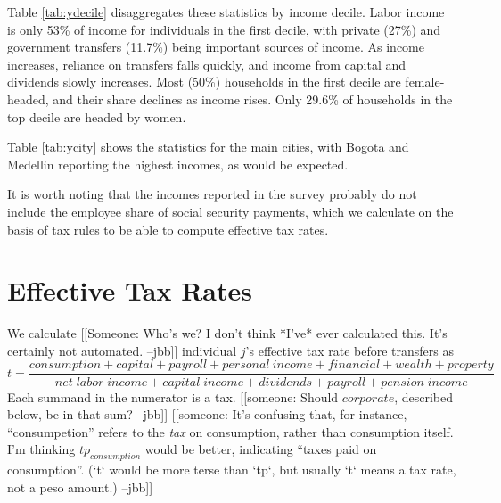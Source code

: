 \documentclass[12pt]{article}
\begin{document}
Table \ref{tab:ydecile} disaggregates these statistics by income decile.
Labor income is only 53\% of income for individuals in the first decile,
with private (27\%) and government transfers (11.7\%)
being important sources of income.
As income increases, reliance on transfers falls quickly,
and income from capital and dividends slowly increases.
Most (50\%) households in the first decile are female-headed,
and their share declines as income rises.
Only 29.6\% of households in the top decile are headed by women.

Table \ref{tab:ycity} shows the statistics for the main cities,
with Bogota and Medellin reporting the highest incomes, as would be expected.

It is worth noting that the incomes reported in the survey
probably do not include the employee share of social security payments,
which we calculate on the basis of tax rules
to be able to compute effective tax rates.

\section{Effective Tax Rates}
We calculate
[[Someone:
    Who's we? I don't think *I've* ever calculated this.
    It's certainly not automated.
    --jbb]]
individual $j$'s effective tax rate before transfers as
\begin{equation}
  t=\frac
  {consumption + capital + payroll + personal\ income + financial + wealth + property}
  {net \; labor \;income +capital \;income + dividends + payroll + pension \;income}
\end{equation}
Each summand in the numerator is a tax.
[[someone:
    Should $corporate$, described below, be in that sum?
    --jbb]]
[[someone:
    It's confusing that, for instance,
    ``consumpetion'' refers to the \textit{tax} on consumption,
    rather than consumption itself.
    I'm thinking $tp_{consumption}$ would be better,
    indicating ``taxes paid on consumption''.
    (`t` would be more terse than `tp`,
    but usually `t` means a tax rate, not a peso amount.)
    --jbb]]
\end{document}

